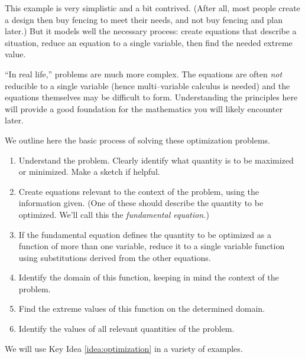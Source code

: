 This example is very simplistic and a bit contrived. (After all, most people create a design then buy fencing to meet their needs, and not buy fencing and plan later.) But it models well the necessary process: create equations that describe a situation, reduce an equation to a single variable, then find the needed extreme value.

``In real life,'' problems are much more complex. The equations are often \textit{not} reducible to a single variable (hence multi--variable calculus is needed) and the equations themselves may be difficult to form. Understanding the principles here will provide a good foundation for the mathematics you will likely encounter later.

We outline here the basic process of solving these optimization problems.
\enlargethispage{2\baselineskip}
{}
{\begin{enumerate}
		\item		Understand the problem. Clearly identify what quantity is to be maximized or minimized. Make a sketch if helpful.
		\item		Create equations relevant to the context of the problem, using the information given. (One of these should describe the quantity to be optimized. We'll call this the \textit{fundamental equation.})
		\item		If the fundamental equation defines the quantity to be optimized as a function of more than one variable, reduce it to a single variable function using substitutions derived from the other equations.

		\item		Identify the domain of this function, keeping in mind the context of the problem.
		\item		Find the extreme values of this function on the determined domain.
		\item		Identify the values of all relevant quantities of the problem.
		\end{enumerate}
}

We will use Key Idea \ref{idea:optimization} in a variety of examples.\\

